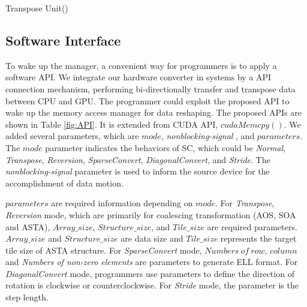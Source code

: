 \documentclass[10pt,journal,compsoc]{IEEEtran}
\begin{document}
\begin{algorithm} [h]
\KwIn{
Block of origin data from source memory}
\KwResult{
Block of transformed data to destination memory}
\caption{Transpose Unit()}
\label{alg:TU}
\end{algorithm}




\subsection{Software Interface}

To wake up the manager, a convenient way for programmers is to apply a software API.
We integrate our hardware converter in systems by a API connection mechanism, performing bi-directionally transfer and transpose data between CPU and GPU.
The programmer could exploit the proposed API to wake up the memory access manager for data
reshaping. The proposed APIs are shown in Table \ref{fig:API}. It is extended from
CUDA API, $ cudaMemcpy()$.
We added several parameters, which are $ mode $,  \textit{nonblocking-signal}  , and $parameters$.
The $mode$ parameter indicates the behaviors of SC, which could be \textit{Normal}, \textit{Transpose}, \textit{Reversion}, \textit{SparseConvert},  \textit{DiagonalConvert}, and  \textit{Stride}.
The \textit{nonblocking-signal} parameter is used to inform the source device for the accomplishment of data motion.

$parameters$ are required information depending on $ mode $.
For \textit{Transpose}, \textit{Reversion} mode, which are
 primarily for coalescing transformation (AOS, SOA and ASTA),  $ Array\_size $,
 $ Structure\_size $, and $ Tile\_size $ are required parameters.
$Array\_size$ and $Structure\_size$ are data size and
$Tile\_size$ represents the target tile size of ASTA structure.
 For \textit{SparseConvert} mode, $ Numbers\ of\ row $, $ column $ and   \textit{Numbers of non-zero elements}  are parameters to generate  ELL format.
 For  \textit{DiagonalConvert} mode, programmers use parameters to define the direction of rotation is clockwise or counterclockwise.
 For \textit{Stride} mode, the parameter is the step length.
\end{document}
